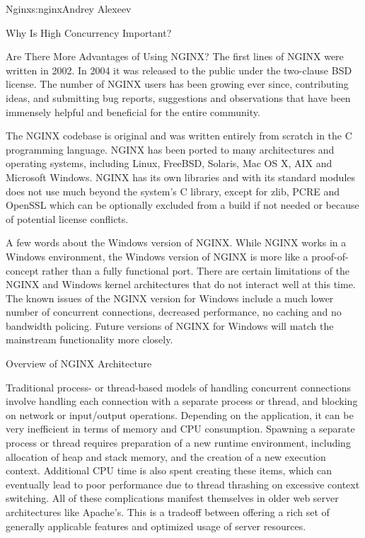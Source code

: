 \begin{aosachapter}{Nginx}{s:nginx}{Andrey Alexeev}
\begin{aosasect1}{Why Is High Concurrency Important?}
\begin{aosasect2}{Are There More Advantages of Using NGINX?}
The first lines of NGINX were written in 2002. In 2004 it was released
to the public under the two-clause BSD license. The number of NGINX
users has been growing ever since, contributing ideas, and submitting
bug reports, suggestions and observations that have been immensely
helpful and beneficial for the entire community.

The NGINX codebase is original and was written entirely from scratch
in the C programming language. NGINX has been ported to many
architectures and operating systems, including Linux, FreeBSD,
Solaris, Mac OS X, AIX and Microsoft Windows. NGINX has its own
libraries and with its standard modules does not use much beyond the
system's C library, except for zlib, PCRE and OpenSSL which can be
optionally excluded from a build if not needed or because of potential
license conflicts.

A few words about the Windows version of NGINX. While NGINX works in a
Windows environment, the Windows version of NGINX is more like a
proof-of-concept rather than a fully functional port. There are
certain limitations of the NGINX and Windows kernel architectures that
do not interact well at this time. The known issues of the NGINX
version for Windows include a much lower number of concurrent
connections, decreased performance, no caching and no bandwidth
policing. Future versions of NGINX for Windows will match the
mainstream functionality more closely.

\end{aosasect2}

\end{aosasect1}

\begin{aosasect1}{Overview of NGINX Architecture}

Traditional process- or thread-based models of handling concurrent
connections involve handling each connection with a separate process
or thread, and blocking on network or input/output
operations. Depending on the application, it can be very inefficient
in terms of memory and CPU consumption. Spawning a separate process or
thread requires preparation of a new runtime environment, including
allocation of heap and stack memory, and the creation of a new
execution context. Additional CPU time is also spent creating these
items, which can eventually lead to poor performance due to thread
thrashing on excessive context switching. All of these complications
manifest themselves in older web server architectures like
Apache's. This is a tradeoff between offering a rich set of generally
applicable features and optimized usage of server resources.


\end{aosasect1}
\end{aosachapter}
